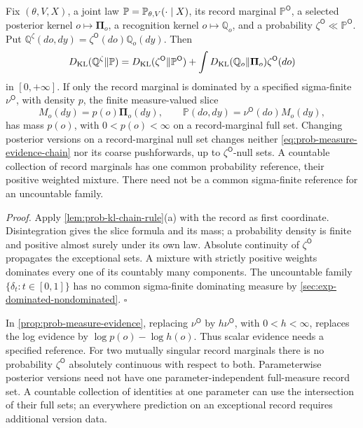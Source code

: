 Fix $(\theta,V,X)$, a joint law $\mathbb P=\mathbb P_{\theta,V}(\cdot\mid X)$,
its record marginal $\mathbb P^{\mathsf O}$, a selected posterior kernel
$o\mapsto\boldsymbol\Pi_o$, a recognition kernel $o\mapsto\mathbb Q_o$,
and a probability $\zeta^{\mathsf O}\ll\mathbb P^{\mathsf O}$. Put
$\mathbb Q^\zeta(do,dy)=\zeta^{\mathsf O}(do)\mathbb Q_o(dy)$. Then
\begin{equation}
D_{\mathrm{KL}}(\mathbb Q^\zeta\Vert\mathbb P)
=D_{\mathrm{KL}}(\zeta^{\mathsf O}\Vert\mathbb P^{\mathsf O})
+\int D_{\mathrm{KL}}(\mathbb Q_o\Vert\boldsymbol\Pi_o)\zeta^{\mathsf O}(do)
\label{eq:prob-measure-evidence-chain}
\end{equation}
in $[0,+\infty]$. If only the record marginal is dominated by a specified
sigma-finite $\nu^{\mathsf O}$, with density $p$, the finite measure-valued
slice
\begin{equation}
M_o(dy)=p(o)\boldsymbol\Pi_o(dy),
\qquad
\mathbb P(do,dy)=\nu^{\mathsf O}(do)M_o(dy),
\label{eq:prob-measure-slice}
\end{equation}
has mass $p(o)$, with $0<p(o)<\infty$ on a record-marginal full set.
Changing posterior versions on a record-marginal null set changes neither
\eqref{eq:prob-measure-evidence-chain} nor its coarse pushforwards, up to
$\zeta^{\mathsf O}$-null sets. A countable collection of record marginals
has one common probability reference, their positive weighted mixture.
There need not be a common sigma-finite reference for an uncountable family.

\noindent\emph{Proof.}
Apply \cref{lem:prob-kl-chain-rule}(a) with the record as first coordinate.
Disintegration gives the slice formula and its mass; a probability density
is finite and positive almost surely under its own law. Absolute continuity
of $\zeta^{\mathsf O}$ propagates the exceptional sets. A mixture with
strictly positive weights dominates every one of its countably many
components. The uncountable family $\{\delta_t:t\in[0,1]\}$ has no common
sigma-finite dominating measure by \cref{sec:exp-dominated-nondominated}.
\hfill$\square$

In \cref{prop:prob-measure-evidence}, replacing $\nu^{\mathsf O}$ by
$h\nu^{\mathsf O}$, with $0<h<\infty$, replaces the log evidence by
$\log p(o)-\log h(o)$. Thus scalar evidence needs a specified reference.
For two mutually singular record marginals there is no probability
$\zeta^{\mathsf O}$ absolutely continuous with respect to both.
Parameterwise posterior versions need not have one parameter-independent
full-measure record set. A countable collection of identities at one
parameter can use the intersection of their full sets; an everywhere
prediction on an exceptional record requires additional version data.

